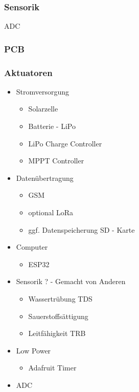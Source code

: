\subsubsection{Sensorik}
ADC
\subsubsection{PCB}
\subsubsection{Aktuatoren}
\begin{itemize}
    \item Stromversorgung
    \begin{itemize}
        \item Solarzelle
    \end{itemize}
    \begin{itemize}
        \item Batterie - LiPo
        \item LiPo Charge Controller
        \item MPPT Controller
    \end{itemize}
    \item Datenübertragung
    \begin{itemize}
        \item GSM
        \item optional LoRa
        \item ggf. Datenspeicherung SD - Karte
    \end{itemize}
    \item Computer
    \begin{itemize}
        \item ESP32
    \end{itemize}
    \item Sensorik ? - Gemacht von Anderen
    \begin{itemize}
        \item Wassertrübung TDS
        \item Sauerstoffsättigung
        \item Leitfähigkeit TRB
    \end{itemize}
    \item Low Power
    \begin{itemize}
        \item Adafruit Timer
    \end{itemize}
    \item ADC
    \begin{itemize}

\end{itemize}
\end{itemize}
